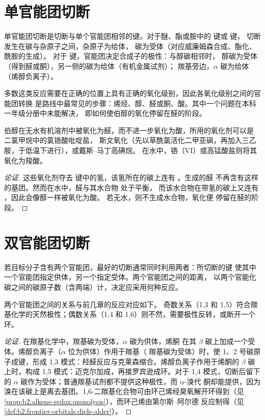 \section{单官能团切断}

单官能团切断是切断与单个官能团相邻的键。对于醚、酯或胺中的  键或  键，
切断发生在碳与杂原子之间，杂原子为给体，
碳为受体（对应威廉姆森合成、酯化、酰胺的生成）。
对于  键，官能团决定合成子的极性：与醇碳相邻时，
醇碳为受体（得到醛或酮），另一侧的碳为给体（有机金属试剂）；
羰基旁边，$\alpha$ 碳为给体（烯醇负离子）。

多数这类反应需要在正确的位置上具有正确的氧化级别，因此各氧化级别之间的官能团转换
是路线中最常见的步骤：烯烃、醇、醛或酮、酸。其中一个问题在本科一年级分册中未能解决，
即如何使伯醇的氧化停留在醛的阶段。

\begin{proposition}[温和氧化]\label{prop:b2:retrosynthesis:mild-oxidation}
伯醇在无水有机溶剂中被氧化为醛，而不进一步氧化为酸，所用的氧化剂可以是
二氯甲烷中的氯铬酸吡啶盐，
斯文氧化（先以草酰氯活化二甲亚砜，再加入三乙胺，于低温下进行），或戴斯–马丁高碘烷。
在水中，铬（VI）或高锰酸盐则将其氧化为羧酸。
\end{proposition}

\begin{proof}[论证]
这些氧化剂夺去  键中的氢，该氢所在的碳上连有 。生成的醛
不再含有这样的基团。然而在水中，醛与其水合物  处于平衡，
而该水合物在带氢的碳上又连有 ，因此会像醇一样被氧化为酸。
若无水，则不生成水合物，氧化便
停留在醛的阶段。
\end{proof}

\section{双官能团切断}

若目标分子含有两个官能团，最好的切断通常同时利用两者：所切断的键
使其中一个官能团指定供体，另一个指定受体。两个官能团之间的距离，
以两个官能化碳之间的碳原子数（含两端）计，决定应采用何种反应。

\begin{proposition}[模式及其反应]\label{prop:b2:retrosynthesis:patterns}
两个官能团之间的关系与前几章的反应对应如下。
奇数关系（1,3 和 1,5）符合羰基化学的天然极性；偶数关系（1,4
和 1,6）则不然，需要极性反转，或断开一个环。
\end{proposition}


\begin{proof}[论证]
在羰基化学中，羰基碳为受体，$\alpha$ 碳为供体，烯酮
在其 $\beta$ 碳上加成一个受体。烯醇负离子（$\alpha$ 位为供体）作用于羰基（
羰基碳为受体）时，使 1、2 号碳原子成键，形成 1,3 模式：羟醛反应与克莱森缩合。烯醇负离子作用于烯酮的 $\beta$
碳上时，构成 1,5 模式：迈克尔加成，再接罗宾逊成环。对于 1,4 模式，切断后留下的
$\alpha$ 碳作为受体；普通羰基试剂都不提供这种极性，而 $\alpha$-溴代
酮却能提供，因为溴在该碳上是离去基团。1,6-二羰基化合物可由环己烯经臭氧解开环得到（见
\cref{prop:b2:alkene-redox:ozonolysis}），而环己烯由第尔斯–阿尔德
反应制得（见\cref{def:b2:frontier-orbitals:diels-alder}）。
\end{proof}

